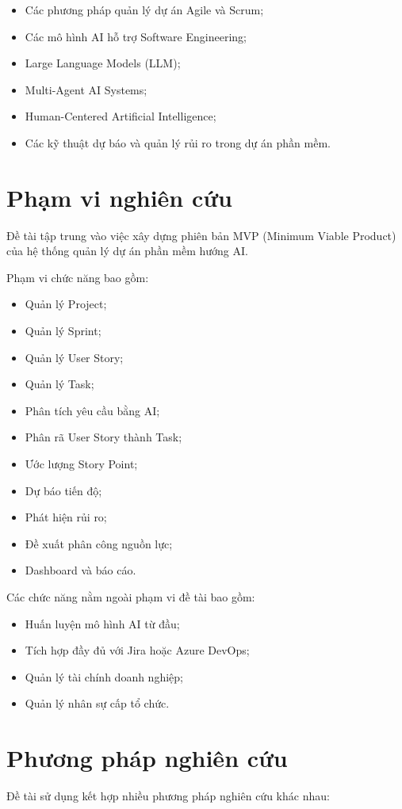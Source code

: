 \documentclass[12pt,a4paper]{report}
\begin{document}
\begin{itemize}
\item Các phương pháp quản lý dự án Agile và Scrum;
\item Các mô hình AI hỗ trợ Software Engineering;
\item Large Language Models (LLM);
\item Multi-Agent AI Systems;
\item Human-Centered Artificial Intelligence;
\item Các kỹ thuật dự báo và quản lý rủi ro trong dự án phần mềm.
\end{itemize}

\section{Phạm vi nghiên cứu}
Đề tài tập trung vào việc xây dựng phiên bản MVP (Minimum Viable Product) của hệ thống quản lý dự án phần mềm hướng AI.

Phạm vi chức năng bao gồm:

\begin{itemize}
\item Quản lý Project;
\item Quản lý Sprint;
\item Quản lý User Story;
\item Quản lý Task;
\item Phân tích yêu cầu bằng AI;
\item Phân rã User Story thành Task;
\item Ước lượng Story Point;
\item Dự báo tiến độ;
\item Phát hiện rủi ro;
\item Đề xuất phân công nguồn lực;
\item Dashboard và báo cáo.
\end{itemize}

Các chức năng nằm ngoài phạm vi đề tài bao gồm:

\begin{itemize}
\item Huấn luyện mô hình AI từ đầu;
\item Tích hợp đầy đủ với Jira hoặc Azure DevOps;
\item Quản lý tài chính doanh nghiệp;
\item Quản lý nhân sự cấp tổ chức.
\end{itemize}

\section{Phương pháp nghiên cứu}
Đề tài sử dụng kết hợp nhiều phương pháp nghiên cứu khác nhau:
\end{document}
